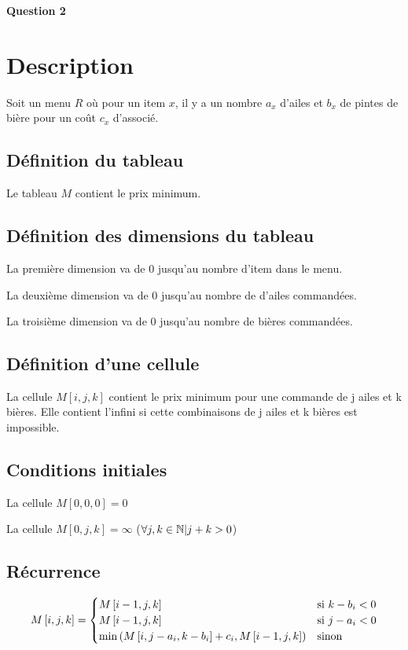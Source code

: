 \documentclass[class=article]{standalone}
\begin{document}
\centerline{\Huge \bf Question 2}
\bigskip

\section*{Description}

Soit un menu $R$ où pour un item $x$, il y a un nombre $a_x$ d'ailes 
et $b_x$ de pintes de bière pour un coût $c_x$ d'associé.

\subsection*{Définition du tableau}

Le tableau $M$ contient le prix minimum.

\subsection*{Définition des dimensions du tableau}

La première dimension va de 0 jusqu'au nombre d'item dans le menu.

La deuxième dimension va de 0 jusqu'au nombre de d'ailes commandées.

La troisième dimension va de 0 jusqu'au nombre de bières commandées.

\subsection*{Définition d'une cellule}

La cellule $M[i,j,k]$ contient le prix minimum pour une commande de j ailes et k bières.
Elle contient l'infini si cette combinaisons de j ailes et k bières est impossible.


\subsection*{Conditions initiales}

La cellule $M[0, 0, 0] = 0$

La cellule $M[0, j, k] = \infty$ ($\forall j, k \in \mathbb{N} | j + k > 0$)

\subsection*{Récurrence}

\[
    M\left [ i, j, k \right ] =
    \begin{cases}
        M\left [ i-1, j, k \right ] & \text{si } k-b_i < 0 \\
        M\left [ i-1, j, k \right ] & \text{si } j-a_i < 0 \\
        \min\left ( M\left [ i, j-a_i, k-b_i \right ] + c_i, M\left [ i-1, j, k \right ] \right ) & \text{sinon }
    \end{cases}
\]
\end{document}

